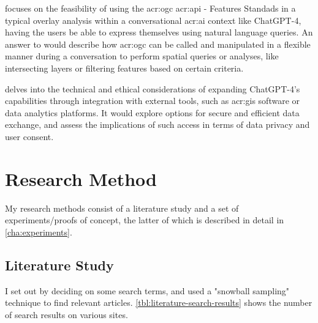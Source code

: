  focuses on the feasibility of using the \acrshort{acr:ogc} \acrshort{acr:api} - Features Standads in a typical overlay analysis within a conversational \acrshort{acr:ai} context like ChatGPT-4, having the users be able to express themselves using natural language queries. An answer to  would describe how \acrshort{acr:ogc}  can be called and manipulated in a flexible manner during a conversation to perform spatial queries or analyses, like intersecting layers or filtering features based on certain criteria.

 delves into the technical and ethical considerations of expanding ChatGPT-4's capabilities through integration with external tools, such as \acrshort{acr:gis} software or data analytics platforms. It would explore options for secure and efficient data exchange, and assess the implications of such access in terms of data privacy and user consent.

\section{Research Method}\label{sec:research-method}

\begin{comment}
What methodology will you apply to address the goals: theoretic/analytic, model/abstraction or design/experiment?
This section will describe the research methodology applied and the reason for this choice of research methodology.
You should return to the actual choices made in the work and the alternatives in the Discussion chapter.
\end{comment}

My research methods consist of a literature study and a set of experiments/proofs of concept, the latter of which is described in detail in \autoref{cha:experiments}.

\subsection{Literature Study}\label{subsec:literature-study}

I set out by deciding on some search terms, and used a "snowball sampling" technique to find relevant articles. \autoref{tbl:literature-search-results} shows the number of search results on various sites.


